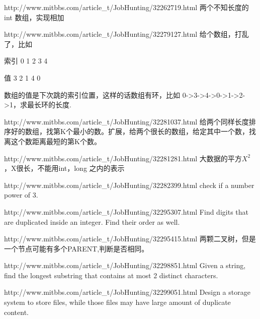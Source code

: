 \documentclass[a4paper]{article}
\begin{document}
\begin{CJK}{UTF8}{gbsn}
\begin{enumerate}
\begin{Q}[Google]{http://www.mitbbs.com/article_t/JobHunting/32262719.html}
两个不知长度的 int 数组，实现相加
\end{Q}

\begin{Q}[Google]{http://www.mitbbs.com/article_t/JobHunting/32279127.html}
给个数组，打乱了，比如

索引 0 1 2 3 4

值   3 2 1 4 0

数组的值是下次跳的索引位置，这样的话数组有环，比如 0->3->4->0->1->2->1，求最长环的长度.
\end{Q}

\begin{Q}[Google]{http://www.mitbbs.com/article_t/JobHunting/32281037.html}
给两个同样长度排序好的数组，找第K个最小的数。扩展，给两个很长的数组，给定其中一个数，找离这个数距离最短的第K个数。
\end{Q}

\begin{Q}[Google]{http://www.mitbbs.com/article_t/JobHunting/32281281.html}
大数据的平方$X^2$，X很长，不能用int，long 之内的表示
\end{Q}

\begin{Q}[Google]{http://www.mitbbs.com/article_t/JobHunting/32282399.html}
check if a number power of 3.
\end{Q}

\begin{Q}[Bloomberg]{http://www.mitbbs.com/article_t/JobHunting/32295307.html}
Find digits that are duplicated inside an integer. Find their order as well.
\end{Q}

\begin{Q}[Google]{http://www.mitbbs.com/article_t/JobHunting/32295415.html}
两颗二叉树，但是一个节点可能有多个PARENT,判断是否相同。
\end{Q}

\begin{Q}[Google]{http://www.mitbbs.com/article_t/JobHunting/32298851.html}
Given a string, find the longest substring that contains at most 2 distinct characters.
\end{Q}

\begin{Q}[Apple]{http://www.mitbbs.com/article_t/JobHunting/32299051.html}
Design a storage system to store files, while those files may have large amount of duplicate content. 
\end{Q}


\end{enumerate}
\end{CJK}
\end{document}

